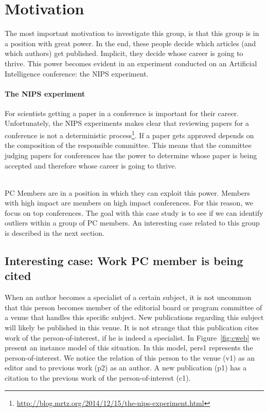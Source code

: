 \documentclass{ou-report}
\begin{document}
\section{Motivation}
The most important motivation to investigate this group, is that this group is 
in a position with great power. In the end, these people decide which articles
(and which authors) get published. Implicit, they decide whose career is going 
to thrive. This power becomes evident in an experiment conducted on an
Artificial Intelligence conference: the NIPS experiment.

\paragraph{The NIPS experiment}
For scientists getting a paper in a conference is important for their career. 
Unfortunately, the NIPS experiments makes clear that reviewing papers for a 
conference is not a deterministic
process\footnote{\url{http://blog.mrtz.org/2014/12/15/the-nips-experiment.html}}.
If a paper gets approved depends on the composition of the responsible
committee. This means that the committee judging papers for conferences has the
power to determine whose paper is being accepted and therefore whose career is
going to thrive.

\ \\
PC Members are in a position in which they can exploit this power. Members with
high impact are members on high impact conferences. For this reason, we focus on
top conferences. The goal with this case study is to see if we can identify
outliers within a group of PC members. An interesting case related to this group
is described in the next section.

\subsection{Interesting case: Work PC member is being cited}
\label{interesting_case:work_member_editorial_board_cited}
When an author becomes a specialist of a certain subject, it is not uncommon 
that this person becomes member of the editorial board or program committee of a venue that handles this specific subject.
New publications regarding this subject will likely be published in this venue. 
It is not strange that this publication cites work of the person-of-interest, if
he is indeed a specialist. In Figure~\ref{fig:cweb} we present an instance model of this situation. In this 
model, pers1 represents the person-of-interest. We notice the relation of this 
person to the venue (v1) as an editor and to previous work (p2) as an author. A 
new publication (p1) has a citation to the previous work of the 
person-of-interest (c1).
\end{document}
